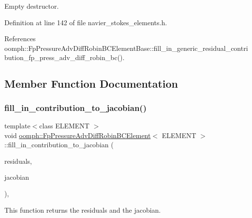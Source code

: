 Empty destructor. 



Definition at line 142 of file navier\+\_\+stokes\+\_\+elements.\+h.



References oomph\+::\+Fp\+Pressure\+Adv\+Diff\+Robin\+B\+C\+Element\+Base\+::fill\+\_\+in\+\_\+generic\+\_\+residual\+\_\+contribution\+\_\+fp\+\_\+press\+\_\+adv\+\_\+diff\+\_\+robin\+\_\+bc().



\subsection{Member Function Documentation}
\mbox{\label{classoomph_1_1FpPressureAdvDiffRobinBCElement_aa9504d4561f8e4030d9a7a6bf4015ce7}} 
\subsubsection{\texorpdfstring{fill\+\_\+in\+\_\+contribution\+\_\+to\+\_\+jacobian()}{fill\_in\_contribution\_to\_jacobian()}}
{\footnotesize\ttfamily template$<$class E\+L\+E\+M\+E\+NT $>$ \\
void \hyperlink{classoomph_1_1FpPressureAdvDiffRobinBCElement}{oomph\+::\+Fp\+Pressure\+Adv\+Diff\+Robin\+B\+C\+Element}$<$ E\+L\+E\+M\+E\+NT $>$\+::fill\+\_\+in\+\_\+contribution\+\_\+to\+\_\+jacobian (\begin{DoxyParamCaption}\item[{\hyperlink{classoomph_1_1Vector}{Vector}$<$ double $>$ \&}]{residuals,  }\item[{\hyperlink{classoomph_1_1DenseMatrix}{Dense\+Matrix}$<$ double $>$ \&}]{jacobian }\end{DoxyParamCaption})\hspace{0.3cm}{\ttfamily [inline]}, {\ttfamily [virtual]}}



This function returns the residuals and the jacobian. 




